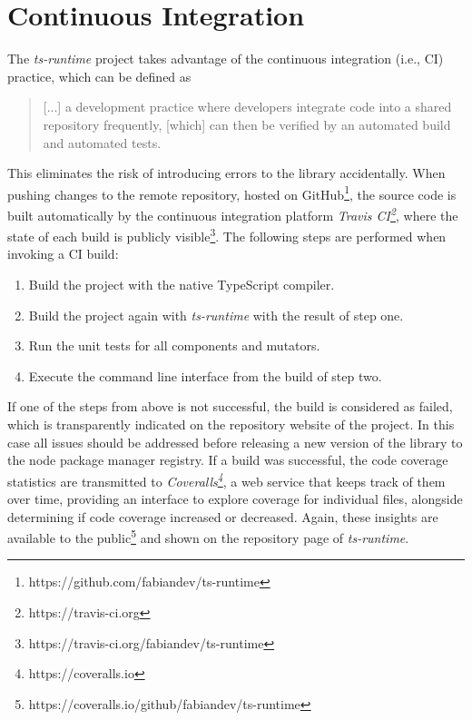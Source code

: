 \section{Continuous Integration}
\label{sec:continuous-integration}

The \emph{ts-runtime} project takes advantage of the continuous integration (i.e., CI) practice, which can be defined as
\begin{quote}
  [...] a development practice where developers integrate code into a shared repository frequently, [which] can then be verified by an automated build and automated tests.~\cite{ContinuousIntegration:Codeship}%
\end{quote}
This eliminates the risk of introducing errors to the library accidentally. When pushing changes to the remote repository, hosted on GitHub\footnote{https://github.com/fabiandev/ts-runtime}, the source code is built automatically by the continuous integration platform \emph{Travis CI\footnote{https://travis-ci.org}}, where the state of each build is publicly visible\footnote{https://travis-ci.org/fabiandev/ts-runtime}. The following steps are performed when invoking a CI build:
\begin{enumerate}
  \item Build the project with the native TypeScript compiler.
  \item Build the project again with \emph{ts-runtime} with the result of step one.
  \item Run the unit tests for all components and mutators.
  \item Execute the command line interface from the build of step two.
\end{enumerate}
If one of the steps from above is not successful, the build is considered as failed, which is transparently indicated on the repository website of the project. In this case all issues should be addressed before releasing a new version of the library to the node package manager registry. If a build was successful, the code coverage statistics are transmitted to \emph{Coveralls\footnote{https://coveralls.io}}, a web service that keeps track of them over time, providing an interface to explore coverage for individual files, alongside determining if code coverage increased or decreased. Again, these insights are available to the public\footnote{https://coveralls.io/github/fabiandev/ts-runtime} and shown on the repository page of \emph{ts-runtime}.

